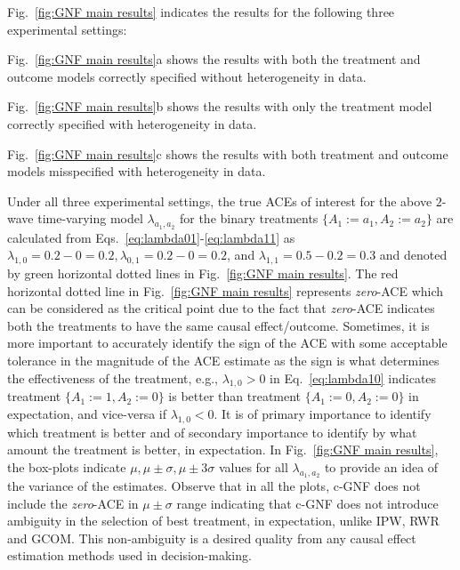 \documentclass[letterpaper]{article} %
\begin{document}
Fig.~\ref{fig:GNF main results} indicates the results for the following three experimental settings: 
\begin{inparaenum}[(i)]
\item Fig.~\ref{fig:GNF main results}a shows the results with both the treatment and outcome models correctly specified without heterogeneity in data.
\item Fig.~\ref{fig:GNF main results}b shows the results with only the treatment model correctly specified with heterogeneity in data.
\item Fig.~\ref{fig:GNF main results}c shows the results with both treatment and outcome models misspecified with heterogeneity in data.
\end{inparaenum}
Under all three experimental settings, the true ACEs of interest for the above $2$-wave time-varying model $\lambda_{a_1,a_2}$ for the binary treatments $\{{A_1}{ := }a_1, {A_2}{ := }a_2\}$ are calculated from Eqs.~\eqref{eq:lambda01}-\eqref{eq:lambda11} as $\lambda_{1,0}{ = }{0.2{ - }0}{ = }0.2, \lambda_{0,1}{ = }{0.2{ - }0}{ = }0.2$, and $\lambda_{1,1}{ = }{0.5{ - }0.2}{ = }0.3$ and denoted by green horizontal dotted lines in Fig.~\ref{fig:GNF main results}.
The red horizontal dotted line in Fig.~\ref{fig:GNF main results} represents \emph{zero}-ACE which can be considered as the critical point due to the fact that \emph{zero}-ACE indicates both the treatments to have the same causal effect/outcome. Sometimes, it is more important to accurately identify the sign of the ACE with some acceptable tolerance in the magnitude of the ACE estimate as the sign is what determines the effectiveness of the treatment, e.g., $\lambda_{1,0}{ > }0$ in Eq.~\eqref{eq:lambda10} indicates treatment $\{{A_1}{ := }1, {A_2}{ := }0\}$ is better than treatment $\{{A_1}{ := }0, {A_2}{ := }0\}$ in expectation, and vice-versa if $\lambda_{1,0}{ < }0$. It is of primary importance to identify which treatment is better and of secondary importance to identify by what amount the treatment is better, in expectation.
In Fig.~\ref{fig:GNF main results}, the box-plots indicate {$\mu, \mu{ \pm }\sigma,\mu{ \pm }3\sigma$} values for all $\lambda_{a_1,a_2}$ to provide an idea of the variance of the estimates.
Observe that in all the plots, c-GNF does not include the \emph{zero}-ACE in $\mu{ \pm }\sigma$ range indicating that c-GNF does not introduce ambiguity in the selection of best treatment, in expectation, unlike IPW, RWR and GCOM. This non-ambiguity is a desired quality from any causal effect estimation methods used in decision-making.
\end{document}
